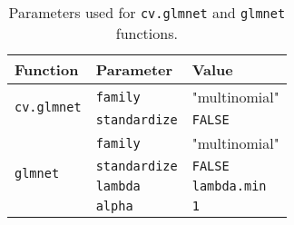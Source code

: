 \begin{table}[H]
    \centering
    \begin{tabular}{|p{3cm}||p{3cm}|p{3cm}|}
        \hline
        \textbf{Function} & \textbf{Parameter} & \textbf{Value} \\
        \hline
        \hline
        \multirow{2}{*}{\texttt{cv.glmnet}} & \texttt{family} & "multinomial" \\
        \cline{2-3}
        & \texttt{standardize} & \texttt{FALSE} \\
        \hline
        \multirow{4}{*}{\texttt{glmnet}} & \texttt{family} & "multinomial" \\
        \cline{2-3}
        & \texttt{standardize} & \texttt{FALSE} \\
        \cline{2-3}
        & \texttt{lambda} & \texttt{lambda.min} \\
        \cline{2-3}
        & \texttt{alpha} & \texttt{1} \\
        \hline
    \end{tabular}
    \protect\caption{Parameters used for \texttt{cv.glmnet} and \texttt{glmnet} functions.}
    \label{tab:glmnet_conv_reg}
\end{table}
